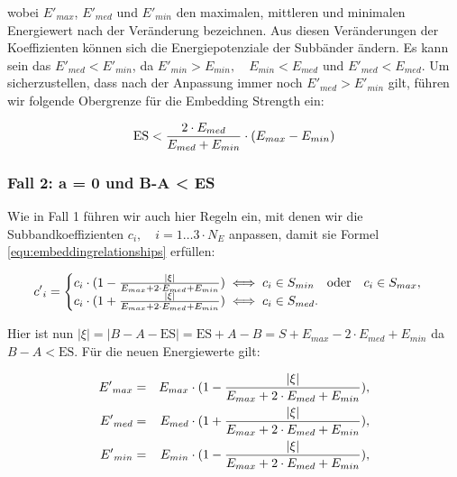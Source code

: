 wobei ${E'}_{max}$, ${E'}_{med}$ und ${E'}_{min}$ den maximalen, mittleren und minimalen Energiewert nach der Veränderung bezeichnen. Aus diesen Veränderungen der Koeffizienten können sich die Energiepotenziale der Subbänder ändern. Es kann sein das ${E'}_{med} < {E'}_{min}$, da ${E'}_{min}>{E}_{min},\quad {E}_{min}<{E}_{med}$ und ${E'}_{med}<{E}_{med}$. Um sicherzustellen, dass nach der Anpassung immer noch ${E'}_{med} > {E'}_{min}$ gilt, führen wir folgende Obergrenze für die Embedding Strength ein:

	\begin{equation}
		\mbox{ES} < { 2 \cdot {E}_{med} \over {E}_{med} + {E}_{min} } \cdot ( {E}_{max} - {E}_{min} )
		\label{equ:embeddingstrengthconstraint_case1}
	\end{equation}

\subsubsection{Fall 2: a = 0 und B-A < ES}

Wie in Fall 1 führen wir auch hier Regeln ein, mit denen wir die Subbandkoeffizienten ${c}_{i},\quad i=1\dots{3\cdot{N}_{E}}$ anpassen, damit sie Formel \ref{equ:embeddingrelationships} erfüllen:

	 \begin{equation}
		 {c'}_{i} = \begin{cases}
    	 				{c}_{i} \cdot ( 1 - { |\xi| \over {{E}_{max} + 2\cdot {E}_{med} + {E}_{min}} }) \iff {c}_{i} \in {S}_{min} \quad\mbox{oder}\quad {c}_{i} \in {S}_{max}, 
						\\
    					{c}_{i} \cdot ( 1 + { |\xi| \over {{E}_{max} + 2\cdot {E}_{med} + {E}_{min}} }) \iff {c}_{i} \in {S}_{med}.
  				  	\end{cases}
		  \label{equ:modifcoef_case2}
	 \end{equation}
	 
Hier ist nun  $|\xi| = |B-A-\mbox{ES}| = \mbox{ES}+A-B = S + {E}_{max} - 2\cdot {E}_{med} + {E}_{min}$ da $B-A<\mbox{ES}$. Für die neuen Energiewerte gilt:

	 \begin{eqnarray*}
		 {E'}_{max} & = & {E}_{max} \cdot (1 - { |\xi| \over {{E}_{max} + 2\cdot {E}_{med} + {E}_{min}} }),
		 \\ 
		 {E'}_{med} & = & {E}_{med} \cdot (1 + { |\xi| \over {{E}_{max} + 2\cdot {E}_{med} + {E}_{min}} }),
		 \\
		 {E'}_{min} & = & {E}_{min} \cdot (1 - { |\xi| \over {{E}_{max} + 2\cdot {E}_{med} + {E}_{min}} }),
	\end{eqnarray*}
	
